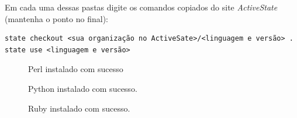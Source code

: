 \documentclass[a4paper,11pt]{article}
\begin{document}
Em cada uma dessas pastas digite os comandos copiados do site \textit{ActiveState} (mantenha o ponto no final):


\begin{verbatim}
state checkout <sua organização no ActiveSate>/<linguagem e versão> .
state use <linguagem e versão>
\end{verbatim}

\begin{figure}[H]
	\centering
	\caption{Perl instalado com sucesso}
	\label{fig:perl_install_1}
\end{figure}

\begin{figure}[H]
	\centering
	\caption{Python instalado com sucesso.}
	\label{fig:python_install_1}
\end{figure}

\begin{figure}[H]
	\centering
	\caption{Ruby instalado com sucesso.}
	\label{fig:ruby_install_1}
\end{figure}
\end{document}
